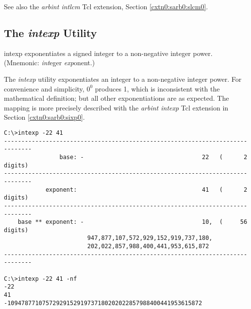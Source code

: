 \begin{dosutilcommandseealso}
See also the \emph{arbint intlcm} Tcl extension, 
Section \ref{cxtn0:sarb0:slcm0}.
\end{dosutilcommandseealso}


\subsection{The \emph{intexp} Utility}
\label{cdcm0:sali0:sixp0}

\begin{dosutilcommandname}{intexp}%
exponentiates a signed integer to a non-negative integer
power.  (Mnemonic:  \emph{int}eger
\emph{exp}onent.)
\end{dosutilcommandname}

\begin{dosutilcommandsynopsis}
\end{dosutilcommandsynopsis}

\begin{dosutilcommanddescription}
The \emph{intexp} utility exponentiates an integer to a non-negative
integer power.  For convenience and simplicity, $0^0$ produces 1,
which is inconsistent with the mathematical definition; but all other
exponentiations are as expected.  The mapping is more precisely described
with the \emph{arbint intexp} Tcl extension in 
Section \ref{cxtn0:sarb0:sixp0}.
\end{dosutilcommanddescription}

\begin{dosutilcommandsampleinvocations}
\begin{scriptsize}
\begin{verbatim}
C:\>intexp -22 41
------------------------------------------------------------------------------
                base: -                                  22   (      2 digits)
------------------------------------------------------------------------------
            exponent:                                    41   (      2 digits)
------------------------------------------------------------------------------
    base ** exponent: -                                  10,  (     56 digits)
                        947,877,107,572,929,152,919,737,180,
                        202,022,857,988,400,441,953,615,872
------------------------------------------------------------------------------

C:\>intexp -22 41 -nf
-22
41
-10947877107572929152919737180202022857988400441953615872
\end{verbatim}
\end{scriptsize}
\end{dosutilcommandsampleinvocations}

